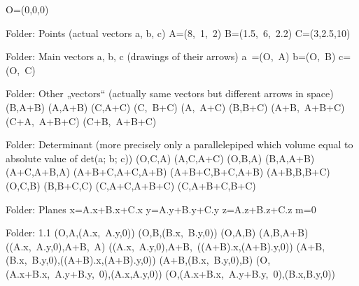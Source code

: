 O=\left(0,0,0\right)

Folder: Points (actual vectors a, b, c)
A=\left(8,\ 1,\ 2\right)
B=\left(1.5,\ 6,\ 2.2\right)
C=\left(3,2.5,10\right)

Folder: Main vectors a, b, c (drawings of their arrows)
a\ =\left(O,\ A\right)
b=\left(O,\ B\right)
c=\left(O,\ C\right)

Folder: Other „vectors“ (actually same vectors but different arrows in space)
\left(B,A+B\right)
\left(A,A+B\right)
\left(C,A+C\right)
\left(C,\ B+C\right)
\left(A,\ A+C\right)
\left(B,B+C\right)
\left(A+B,\ A+B+C\right)
\left(C+A,\ A+B+C\right)
\left(C+B,\ A+B+C\right)

Folder: Determinant (more precisely only a parallelepiped which volume equal to absolute value of det(a; b; c))
\left(O,C,A\right)
\left(A,C,A+C\right)
\left(O,B,A\right)
\left(B,A,A+B\right)
\left(A+C,A+B,A\right)
\left(A+B+C,A+C,A+B\right)
\left(A+B+C,B+C,A+B\right)
\left(A+B,B,B+C\right)
\left(O,C,B\right)
\left(B,B+C,C\right)
\left(C,A+C,A+B+C\right)
\left(C,A+B+C,B+C\right)

Folder: Planes
x=A.x+B.x+C.x
y=A.y+B.y+C.y
z=A.z+B.z+C.z
m=0

Folder: 1.1
\left(O,A,\left(A.x,\ A.y,0\right)\right)
\left(O,B,\left(B.x,\ B.y,0\right)\right)
\left(O,A,B\right)
\left(A,B,A+B\right)
\left(\left(A.x,\ A.y,0\right),A+B,\ A\right)
\left(\left(A.x,\ A.y,0\right),A+B,\ \left(\left(A+B\right).x,\left(A+B\right).y,0\right)\right)
\left(A+B,\left(B.x,\ B.y,0\right),\left(\left(A+B\right).x,\left(A+B\right).y,0\right)\right)
\left(A+B,\left(B.x,\ B.y,0\right),B\right)
\left(O,\left(A.x+B.x,\ A.y+B.y,\ 0\right),\left(A.x,A.y,0\right)\right)
\left(O,\left(A.x+B.x,\ A.y+B.y,\ 0\right),\left(B.x,B.y,0\right)\right)

